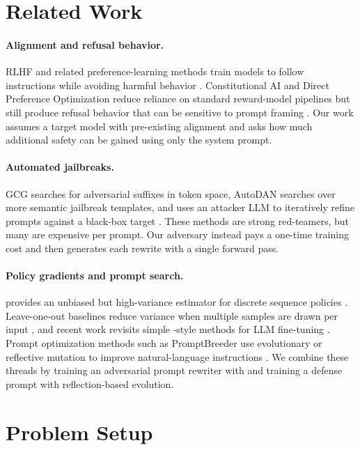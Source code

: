\section{Related Work}

\paragraph{Alignment and refusal behavior.}
RLHF and related preference-learning methods train models to follow instructions while avoiding harmful behavior \citep{christiano2017deep,stiennon2020learning,ouyang2022training}. 
Constitutional AI and Direct Preference Optimization reduce reliance on standard reward-model pipelines but still produce refusal behavior that can be sensitive to prompt framing \citep{bai2022constitutional,rafailov2023direct}. 
Our work assumes a target model with pre-existing alignment and asks how much additional safety can be gained using only the system prompt.

\paragraph{Automated jailbreaks.}
GCG searches for adversarial suffixes in token space, AutoDAN searches over more semantic jailbreak templates, and \pair{} uses an attacker LLM to iteratively refine prompts against a black-box target \citep{zou2023universal,liu2023autodan,chao2023pair}. 
These methods are strong red-teamers, but many are expensive per prompt. 
Our adversary instead pays a one-time training cost and then generates each rewrite with a single forward pass.

\paragraph{Policy gradients and prompt search.}
\reinforce{} provides an unbiased but high-variance estimator for discrete sequence policies \citep{williams1992simple}. 
Leave-one-out baselines reduce variance when multiple samples are drawn per input \citep{kool2019buy}, and recent work revisits simple \reinforce{}-style methods for LLM fine-tuning \citep{ahmadian2024reinforce}. 
Prompt optimization methods such as PromptBreeder use evolutionary or reflective mutation to improve natural-language instructions \citep{fernando2023promptbreeder}. 
We combine these threads by training an adversarial prompt rewriter with \rloo{} and training a defense prompt with reflection-based evolution.

\section{Problem Setup}

